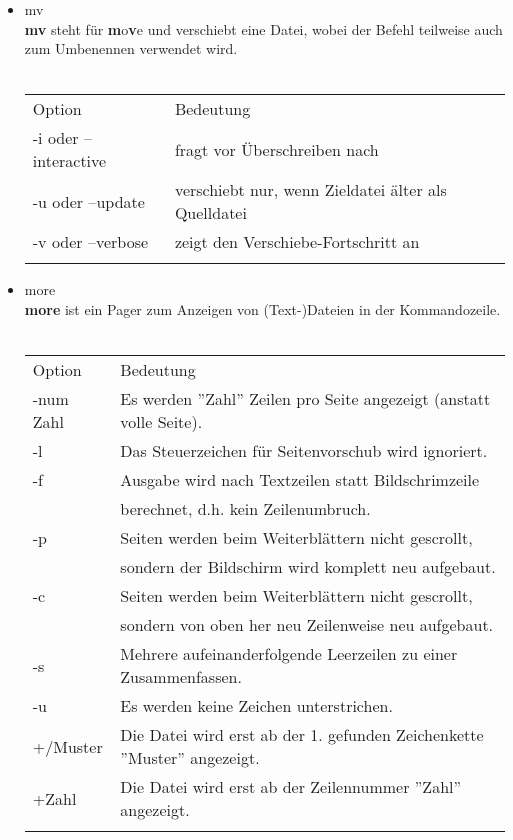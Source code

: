 \begin{itemize}
\begin{tabular}{ll}
			\end{tabular}
			\newpage
			\item mv\\
			\textbf{mv} steht für \textbf{m}o\textbf{v}e und verschiebt eine Datei, wobei der Befehl teilweise auch zum Umbenennen verwendet wird.\\ \\
			\begin{tabular}{ll}
				Option & Bedeutung \\
				-i oder --interactive & fragt vor \"Uberschreiben nach\\
				-u oder --update & verschiebt nur, wenn Zieldatei \"alter als Quelldatei\\
				-v oder --verbose & zeigt den Verschiebe-Fortschritt an\\ \\
			\end{tabular}
			\item more\\
			\textbf{more} ist ein Pager zum Anzeigen von (Text-)Dateien in der Kommandozeile.\\ \\
			\begin{tabular}{ll}
				Option & Bedeutung \\
				-num Zahl & Es werden ''Zahl'' Zeilen pro Seite angezeigt (anstatt volle Seite).\\
				-l & Das Steuerzeichen für Seitenvorschub wird ignoriert.\\
				-f & Ausgabe wird nach Textzeilen statt Bildschrimzeile\\
				& berechnet, d.h. kein Zeilenumbruch.\\
				-p & Seiten werden beim Weiterbl\"attern nicht gescrollt,\\
				& sondern der Bildschirm wird komplett neu aufgebaut.\\
				-c & Seiten werden beim Weiterbl\"attern nicht gescrollt,\\
				& sondern von oben her neu Zeilenweise neu aufgebaut.\\
				-s & Mehrere aufeinanderfolgende Leerzeilen zu einer Zusammenfassen.\\
				-u & Es werden keine Zeichen unterstrichen.\\
				+/Muster & Die Datei wird erst ab der 1. gefunden Zeichenkette ''Muster'' angezeigt.\\
				+Zahl & Die Datei wird erst ab der Zeilennummer ''Zahl'' angezeigt.\\ \\

\end{tabular}
\end{itemize}
